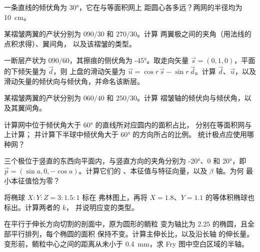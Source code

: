 \begin{exercise}[$\star$]\label{exo:b3:structural-analysis:2}
一条直线的倾伏角为 \ang{30}，它在与等面积网上
距圆心各多远？两网的半径均为 \qty{10}{cm}。
\end{exercise}

\begin{exercise}[$\star$]\label{exo:b3:structural-analysis:3}
某褶皱两翼的产状分别为 $090/30$ 和 $270/30$。计算
两翼极之间的夹角（用法线的点积求得）、翼间角，
以及该褶皱的类型。
\end{exercise}

\begin{exercise}[$\star$]\label{exo:b3:structural-analysis:4}
一断层产状为 $090/60$，其擦痕的侧伏角为 \ang{-45}。取走向矢量
$\vec s = (0, 1, 0)$，平面的下倾矢量为 $\vec d$，则
上盘的滑动矢量为 $\vec u = \cos r\,\vec s - \sin r\,\vec d$。计算
$\vec d$、$\vec u$，以及滑动矢量的倾伏向与倾伏角，并命名该断层。
\end{exercise}

\begin{exercise}[$\star\star$]\label{exo:b3:structural-analysis:5}
某褶皱两翼的产状分别为 $060/40$ 和 $250/30$。计算
褶皱轴的倾伏向与倾伏角，以及其翼间角。
\end{exercise}

\begin{exercise}[$\star\star$]\label{exo:b3:structural-analysis:6}
计算网中位于倾伏角大于 \ang{60} 的直线所对应圆内的面积占比，
分别在等面积网与上计算；
并计算下半球中倾伏角大于 \ang{60} 的方向所占的比例。
统计极点应使用哪种网？
\end{exercise}

\begin{exercise}[$\star\star$]\label{exo:b3:structural-analysis:7}
三个极位于竖直的东西向平面内，与竖直方向的夹角分别为 \ang{-20}、$0$ 和
\ang{20}，即 $\vec p = (\sin a, 0, -\cos a)$。计算它们的
、本征值与特征向量，以及 $\beta$ 轴。为何
最小本征值恰为零？
\end{exercise}

\begin{exercise}[$\star\star$]\label{exo:b3:structural-analysis:8}
将椭球 $X : Y : Z = 3 : 1.5 : 1$ 标在 弗林图上，再将
$X = 1.8$、$Y = 1.1$ 的等体积椭球也标出。计算两者的 $k$，
并说明应变的类型。
\end{exercise}

\begin{exercise}[$\star\star$]\label{exo:b3:structural-analysis:9}
在平行于伸长方向切割的剖面中，原为圆形的鲕粒
变为轴比为 $2.25$ 的椭圆，且全部平行排列，每个椭圆的面积
保持不变。计算主伸长比，以及沿长轴
的伸长量。变形前，鲕粒中心之间的距离从未小于
\qty{0.4}{mm}，求 Fry 图中空白区域的半轴。
\end{exercise}

